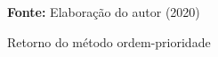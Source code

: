 \begin{figure}[ht!]
\centering

\caption{\textmd{Retorno do método ordem-prioridade}}
\label{fig:retordemprioridade}

\par\medskip\textbf{Fonte:} Elaboração do autor (2020) \par\medskip

\end{figure}
